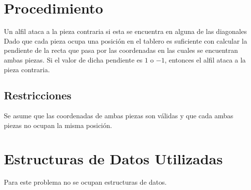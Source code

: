 \documentclass{report}
\begin{document}
\section{Procedimiento}
Un alfil ataca a la pieza contraria si esta se encuentra en alguna de las diagonales 
Dado que cada pieza ocupa una posici\'on en el tablero es suficiente con calcular la pendiente de la recta que pasa 
por las coordenadas en las cuales se encuentran ambas piezas. 
\newline
\newline
Si el valor de dicha pendiente es $1$ o $-1$, entonces el alfil ataca a la pieza contraria.    
%
\subsection{Restricciones}
Se asume que las coordenadas de ambas piezas son v\'alidas y que cada ambas piezas no ocupan la misma posici\'on.
%
\section{Estructuras de Datos Utilizadas}
Para este problema no se ocupan estructuras de datos.
%
\end{document}
